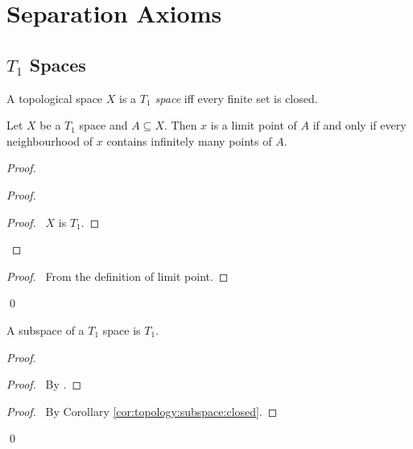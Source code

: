\chapter{Separation Axioms}

\section{$T_1$ Spaces}

\begin{df}[$T_1$ Space]
  A topological space $X$ is a \emph{$T_1$ space} iff every finite set is
  closed.
\end{df}

\begin{thm}
  \label{thm:topology:T1:limit_point}
  Let $X$ be a $T_1$ space and $A \subseteq X$. Then $x$ is a limit point of
  $A$
  if and only if every neighbourhood of $x$ contains infinitely many points
  of
  $A$.
\end{thm}

\begin{proof}
  \pf
  \begin{proof}
    \begin{proof}
      \pf\ $X$ is $T_1$.
    \end{proof}
  \end{proof}
  \begin{proof}
    \pf\ From the definition of limit point.
  \end{proof}
  \qed
\end{proof}

  \begin{prop}
  \label{prop:topology:T1:subspace}
 A subspace of a $T_1$ space is $T_1$.
\end{prop}

\begin{proof}
 \pf
 \begin{proof}
   \pf\ By .
 \end{proof}
 \begin{proof}
   \pf\ By Corollary \ref{cor:topology:subspace:closed}.
 \end{proof}
 \qed
\end{proof}

